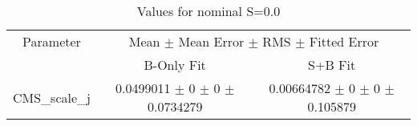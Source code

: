 \begin{table}
\centering
\caption{Values for nominal S=0.0}
\begin{tabular}{ccc}
\toprule
Parameter & \multicolumn{2}{c}{Mean $\pm$ Mean Error $\pm$ RMS $\pm$ Fitted Error}\\
 & B-Only Fit & S+B Fit\\
\midrule
CMS\_scale\_j & \num{0.0499011} $\pm$ \num{0} $\pm$ \num{0} $\pm$ \num{0.0734279} & \num{0.00664782} $\pm$ \num{0} $\pm$ \num{0} $\pm$ \num{0.105879}\\
\bottomrule
\end{tabular}
\end{table}